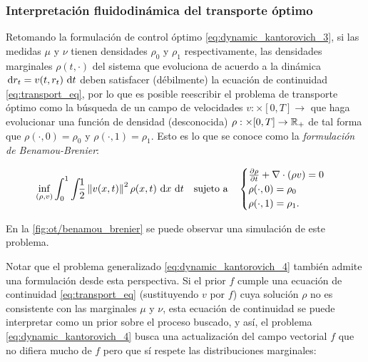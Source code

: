 \subsubsection{Interpretación fluidodinámica del transporte óptimo}

Retomando la formulación de control óptimo \eqref{eq:dynamic_kantorovich_3}, si las medidas $\mu$ y $\nu$ tienen densidades $\rho_0$ y $\rho_1$ respectivamente, las densidades marginales $\rho(t,\cdot)$ del sistema que evoluciona de acuerdo a la dinámica $\,\operatorname{d}\! r_t = v(t,r_t)\,\operatorname{d}\! t$ deben satisfacer (débilmente) la ecuación de continuidad \eqref{eq:transport_eq}, por lo que  es posible reescribir el problema de transporte óptimo como la búsqueda de un campo de velocidades $v:\xspace\times[0,T]\to\xspace$ que haga evolucionar una función de densidad (desconocida) $\rho:\times[0,T]\to\mathbb{R}_+$ de tal forma que $\rho(\cdot,0)=\rho_0$ y $\rho(\cdot,1)=\rho_1$. Esto es lo que se conoce como la \textit{formulación de Benamou-Brenier}:

\begin{equation}
	\label{eq:benamou_brenier}
	\inf_{(\rho,v)} \int_0^1 \int_{} \frac{1}{2}\left\lVert v(x,t) \right\rVert^2 \rho(x,t) \,\operatorname{d}\! x\,\operatorname{d}\! t
	\quad \text{sujeto a} \quad
	\begin{cases}
		\frac{\partial \rho}{\partial t} + \nabla\cdot(\rho v) = 0\\
		\rho(\cdot,0) = \rho_0\\
		\rho(\cdot,1) = \rho_1 .
	\end{cases}
\end{equation}

En la \autoref{fig:ot/benamou_brenier} se puede observar una simulación de este problema.


Notar que el problema generalizado \eqref{eq:dynamic_kantorovich_4} también admite una formulación desde esta perspectiva. Si el prior $f$ cumple una ecuación de continuidad \eqref{eq:transport_eq} (sustituyendo $v$ por $f$) cuya solución $\rho$ no es consistente con las marginales $\mu$ y $\nu$, esta ecuación de continuidad se puede interpretar como un prior sobre el proceso buscado, y así, el problema \eqref{eq:dynamic_kantorovich_4} busca una actualización del campo vectorial $f$ que no difiera mucho de $f$ pero que sí respete las distribuciones marginales:

